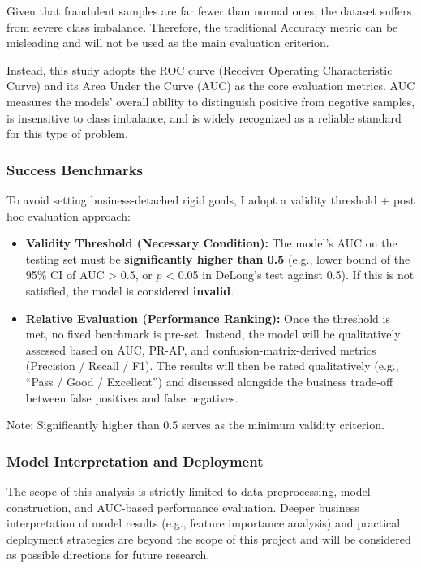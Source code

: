 \documentclass[sigplan,screen]{acmart}
\begin{document}
    Given that fraudulent samples are far fewer than normal ones, the dataset suffers from severe class imbalance. Therefore, the traditional Accuracy metric can be misleading and will not be used as the main evaluation criterion.

Instead, this study adopts the ROC curve (Receiver Operating Characteristic Curve) and its Area Under the Curve (AUC) as the core evaluation metrics\cite{fawcett2006roc}. AUC measures the models'  overall ability to distinguish positive from negative samples, is insensitive to class imbalance, and is widely recognized as a reliable standard for this type of problem.    
    
\subsubsection{Success Benchmarks}
    
    To avoid setting business-detached rigid goals, I adopt a validity threshold + post hoc evaluation approach:

\begin{itemize}
\item \textbf{Validity Threshold (Necessary Condition):} The model's AUC on the testing set must be \textbf{significantly higher than 0.5} (e.g., lower bound of the 95\% CI of AUC > 0.5, or $p$ < 0.05 in DeLong's test against 0.5\cite{delong1988comparing}). If this is not satisfied, the model is considered \textbf{invalid}.
\item \textbf{Relative Evaluation (Performance Ranking):} Once the threshold is met, no fixed benchmark is pre-set. Instead, the model will be qualitatively assessed based on AUC, PR-AP, and confusion-matrix-derived metrics (Precision / Recall / F1). The results will then be rated qualitatively (e.g., ``Pass / Good / Excellent'') and discussed alongside the business trade-off between false positives and false negatives.
\end{itemize}
    
      Note: Significantly higher than 0.5 serves as the minimum validity criterion.
    
\subsubsection{ Model Interpretation and Deployment}
    
    The scope of this analysis is strictly limited to data preprocessing, model construction, and AUC-based performance evaluation. Deeper business interpretation of model results (e.g., feature importance analysis) and practical deployment strategies are beyond the scope of this project and will be considered as possible directions for future research.
\end{document}
